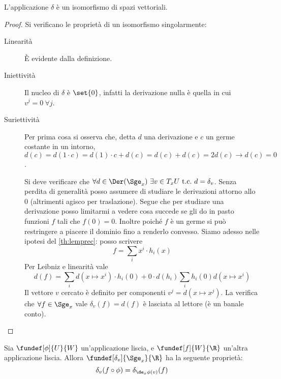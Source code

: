 \begin{lemma}
L'applicazione $\delta$ è un isomorfismo di spazi vettoriali.
\end{lemma}
\begin{proof}
Si verificano le proprietà di un isomorfismo singolarmente:
\begin{description}
\item[Linearità] È evidente dalla definizione.
\item[Iniettività] Il nucleo di $\delta$ è $\set{0}$, infatti la derivazione nulla è quella in cui $v^j = 0~ \forall j$.
\item[Suriettività] 
Per prima cosa si osserva che, detta $d$ una derivazione e $c$ un germe costante in un intorno, $d(c)=d(1\cdot c)=d(1)\cdot c + d(c)=d(c) + d(c) = 2d(c) \rightarrow d(c) = 0$.

Si deve verificare che $\forall d\in \Der(\Sge_x)\ \exists v\in T_x U\ \text{t.c.}\ d = \delta_v$.
Senza perdita di generalità posso assumere di studiare le derivazioni attorno allo $0$ (altrimenti agisco per traslazione).
Segue che per studiare una derivazione posso limitarmi a vedere cosa succede se gli do in pasto funzioni $f$ tali che $f(0)=0$.
Inoltre poiché $f$ è un germe si può restringere a piacere il dominio fino a renderlo convesso.
Siamo adesso nelle ipotesi del \autoref{th:lemprec}: posso scrivere
\begin{equation*} 
	f=\sum_i x^i\cdot h_i(x)
\end{equation*} 
Per Leibniz e linearità vale 
\begin{equation*}
	d(f)=\sum_i d(x\mapsto x^i)\cdot h_i(0)+ 0\cdot d(h_i) \sum_i h_i(0)d(x\mapsto x^i)
\end{equation*}
Il vettore $v$ cercato è definito per componenti $v^j=d(x\mapsto x^j)$. La verifica che $\forall f\in \Sge_x$ vale $\delta_v(f)=d(f)$ è lasciata al lettore (è un banale conto).
\qedhere
\end{description}
\end{proof}

\begin{oss}
Sia $\fundef[\phi]{U}{W}$ un'applicazione liscia, e $\fundef[f]{W}{\R}$ un'altra applicazione liscia. Allora $\fundef[\delta_v]{\Sge_x}{\R}$ ha la seguente proprietà:
\begin{equation*}
\delta_v(f\circ \phi) = \delta_{\de_x\phi (v)}(f)
\end{equation*}
\end{oss}


